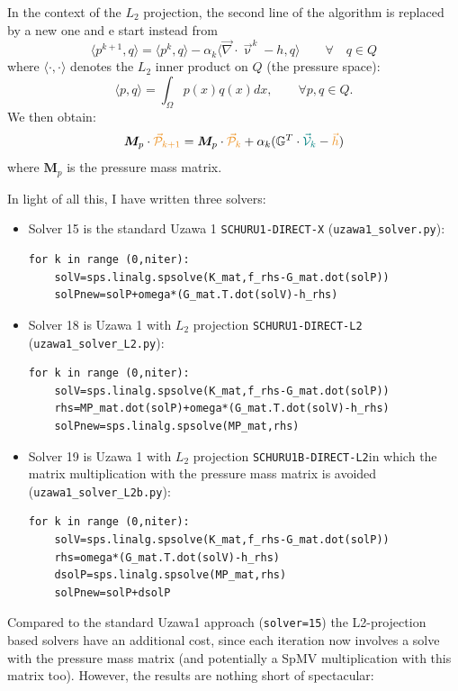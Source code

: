 In the context of the $L_2$ projection, the second line of the algorithm 
is replaced by a new one and e start instead from 
\[
\langle p^{k+1},q  \rangle = 
\langle p^{k},q  \rangle -\alpha_k \langle \vec\nabla \cdot \vec{\upnu}^{k} -h ,q \rangle 
\qquad \forall \quad q\in Q 
\]
where $\langle \cdot,\cdot  \rangle$ denotes the $L_2$ inner product on $Q$ (the pressure space):
\[
\langle p,q \rangle = \int_\Omega p(x)q(x) dx, \qquad \forall p,q \in Q.
\]
We then obtain:
\[
{\bm M}_p \cdot {\color{carrotorange} \vec{\cal P}_{k+1}} 
=
{\bm M}_p \cdot {\color{carrotorange} \vec{\cal P}_{k}}  
+\alpha_k  (\mathbb{G}^T\cdot {\color{teal} \vec{\cal V}_k}   - {\color{carrotorange}\vec{h}})
\]
where ${\bm M}_p$ is the pressure mass matrix.

In light of all this, I have written three solvers:
\begin{itemize}
\item Solver 15 is the standard Uzawa 1 {\tt SCHURU1-DIRECT-X} ({\tt uzawa1\_solver.py}):
\begin{lstlisting}
for k in range (0,niter):
    solV=sps.linalg.spsolve(K_mat,f_rhs-G_mat.dot(solP))
    solPnew=solP+omega*(G_mat.T.dot(solV)-h_rhs)         
\end{lstlisting}

\item Solver 18 is Uzawa 1 with $L_2$ projection {\tt SCHURU1-DIRECT-L2}  ({\tt uzawa1\_solver\_L2.py}):
\begin{lstlisting}
for k in range (0,niter):
    solV=sps.linalg.spsolve(K_mat,f_rhs-G_mat.dot(solP))     
    rhs=MP_mat.dot(solP)+omega*(G_mat.T.dot(solV)-h_rhs)      
    solPnew=sps.linalg.spsolve(MP_mat,rhs)   
\end{lstlisting}


\item Solver 19 is Uzawa 1 with $L_2$ projection {\tt SCHURU1B-DIRECT-L2}in which 
the matrix multiplication with the pressure mass matrix is avoided ({\tt uzawa1\_solver\_L2b.py}):
\begin{lstlisting}
for k in range (0,niter):
    solV=sps.linalg.spsolve(K_mat,f_rhs-G_mat.dot(solP))   
    rhs=omega*(G_mat.T.dot(solV)-h_rhs)                     
    dsolP=sps.linalg.spsolve(MP_mat,rhs)   
    solPnew=solP+dsolP                                    
\end{lstlisting}

\end{itemize}

Compared to the standard Uzawa1 approach (\lstinline{solver=15}) the L2-projection based
solvers have an additional cost, 
since each iteration now involves a solve with the pressure mass matrix 
(and potentially a SpMV multiplication with this matrix too). 
However, the results are nothing short of spectacular:

